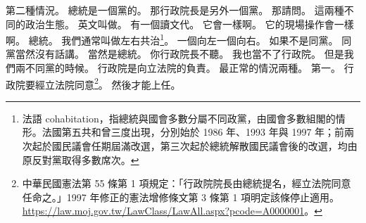 \hypertarget{c01:cue:1211}{}第二種情況。
\hypertarget{c01:cue:1212}{}總統是一個黨的。
\hypertarget{c01:cue:1213}{}那行政院長是另外一個黨。
\hypertarget{c01:cue:1214}{}那請問。
\hypertarget{c01:cue:1215}{}這兩種不同的政治生態。
\hypertarget{c01:cue:1216}{}英文叫做。
\hypertarget{c01:cue:1217}{}有一個讀文代。
\hypertarget{c01:cue:1218}{}它會一樣啊。
\hypertarget{c01:cue:1219}{}它的現場操作會一樣啊。
\hypertarget{c01:cue:1220}{}總統。
\hypertarget{c01:cue:1221}{}我們通常叫做左右共治\footnote{法語 cohabitation，指總統與國會多數分屬不同政黨，由國會多數組閣的情形。法國第五共和曾三度出現，分別始於 1986 年、1993 年與 1997 年；前兩次起於國民議會任期屆滿改選，第三次起於總統解散國民議會後的改選，均由原反對黨取得多數席次。}。
\hypertarget{c01:cue:1222}{}一個向左一個向右。
\hypertarget{c01:cue:1223}{}如果不是同黨。
\hypertarget{c01:cue:1224}{}同黨當然沒有話講。
\hypertarget{c01:cue:1225}{}當然是總統。
\hypertarget{c01:cue:1226}{}你行政院長不聽。
\hypertarget{c01:cue:1227}{}我也當不了行政院。
\hypertarget{c01:cue:1228}{}但是我們兩不同黨的時候。
\hypertarget{c01:cue:1229}{}行政院是向立法院的負責。
\hypertarget{c01:cue:1230}{}最正常的情況兩種。
\hypertarget{c01:cue:1231}{}第一。
\hypertarget{c01:cue:1232}{}行政院要經立法院同意\footnote{中華民國憲法第 55 條第 1 項規定：「行政院院長由總統提名，經立法院同意任命之。」1997 年修正的憲法增修條文第 3 條第 1 項明定該條停止適用。\url{https://law.moj.gov.tw/LawClass/LawAll.aspx?pcode=A0000001}。}。
\hypertarget{c01:cue:1233}{}然後才能上任。

